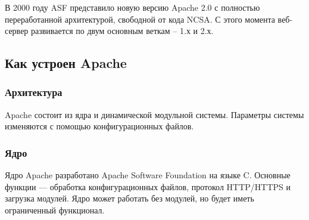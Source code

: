\documentclass[14pt, a4paper]{article}
\begin{document}
В 2000 году ASF представило новую версию Apache 2.0 с полностью переработанной архитектурой, 
свободной от кода NCSA. С этого момента веб-сервер развивается по двум основным веткам – 1.х и 2.х.

\subsection*{Как устроен Apache}

\begin{figure}[h]%
    \centering
    \label{1.1, 1.2}
\end{figure}

\subsubsection*{Архитектура}
Apache состоит из ядра и динамической модульной системы. Параметры системы 
изменяются с помощью конфигурационных файлов.


\subsubsection*{Ядро}
Ядро Apache разработано Apache Software Foundation на языке C. Основные функции — обработка 
конфигурационных файлов, протокол HTTP/HTTPS и загрузка модулей. Ядро может работать без модулей, 
но будет иметь ограниченный функционал.
\end{document}
